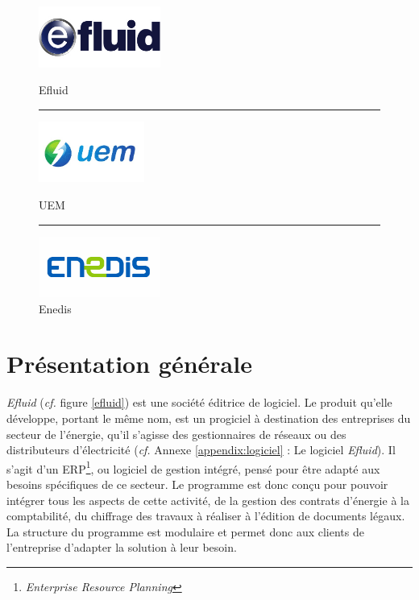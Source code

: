 \documentclass[a4paper, 12pt]{report}
\begin{document}
\begin{figure}[t]
  \begin{center}
    \begin{minipage}{4cm}
      \begin{center}
        \includegraphics[height=2cm]{../res/logo-efluid.jpg}
        \caption{Efluid}
        \label{efluid}
      \end{center}
    \end{minipage}
    \rule{1cm}{0cm}
    \begin{minipage}{4cm}
      \begin{center}
        \includegraphics[height=2cm]{../res/logo-uem.jpg}
        \caption{UEM}
        \label{uem}
      \end{center}
    \end{minipage}
    \rule{1cm}{0cm}
    \begin{minipage}{4cm}
      \begin{center}
        \includegraphics[height=2cm]{../res/logo-enedis.jpg}
        \caption{Enedis}
        \label{enedis}
      \end{center}
    \end{minipage}
  \end{center}
\end{figure}

\section{Présentation générale}

\textit{Efluid} (\textit{cf.} figure \ref{efluid}) est une société éditrice de logiciel. Le produit qu'elle développe, portant le même nom, est un progiciel à destination des entreprises du secteur de l'énergie, qu'il s'agisse des gestionnaires de réseaux ou des distributeurs d'électricité (\textit{cf.} Annexe \ref{appendix:logiciel} : Le logiciel \textit{Efluid}). Il s'agit d'un ERP\footnote{\textit{Enterprise Resource Planning}}, ou logiciel de gestion intégré, pensé pour être adapté aux besoins spécifiques de ce secteur. Le programme est donc conçu pour pouvoir intégrer tous les aspects de cette activité, de la gestion des contrats d'énergie à la comptabilité, du chiffrage des travaux à réaliser à l'édition de documents légaux. La structure du programme est modulaire et permet donc aux clients de l'entreprise d'adapter la solution à leur besoin.\\
\end{document}
